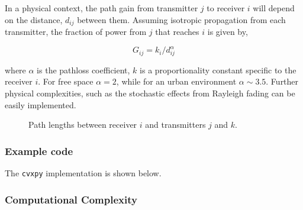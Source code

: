 \documentclass[twocolumn,secnumarabic,amssymb, nobibnotes, aps, prl,superscriptaddress]{revtex4-1}
\begin{document}
In a physical context, the path gain from transmitter $j$ to receiver $i$ will depend on the distance, $d_{ij}$ between them.  Assuming isotropic propagation from each transmitter, the fraction of power from $j$ that reaches $i$ is given by,

\begin{equation}
G_{ij} = k_i/d_{ij}^\alpha
\end{equation}

where $\alpha$ is the pathloss coefficient, $k$ is a proportionality constant specific to the receiver $i$.  For free space $\alpha = 2$, while for an urban environment $\alpha \sim 3.5$.  Further physical complexities, such as the stochastic effects from Rayleigh fading can be easily implemented.

\begin{figure}[H]
\centering
{}
\caption{Path lengths between receiver $i$ and transmitters $j$ and $k$.}\label{fig:spatial_diagram}
\end{figure}

\subsubsection{Example code}
The \texttt{cvxpy} implementation is shown below.


\subsubsection{Computational Complexity}
\end{document}
